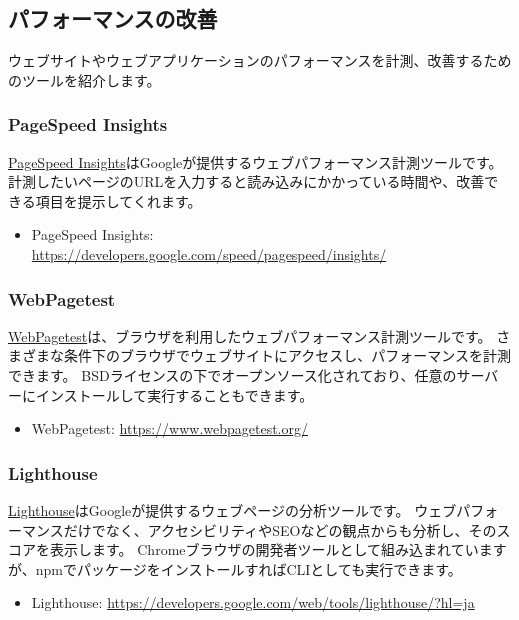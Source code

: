 \hypertarget{performance-improvement}{%
\subsection{パフォーマンスの改善}\label{performance-improvement}}

ウェブサイトやウェブアプリケーションのパフォーマンスを計測、改善するためのツールを紹介します。

\hypertarget{pagespeed}{%
\subsubsection{PageSpeed Insights}\label{pagespeed}}

\href{https://developers.google.com/speed/pagespeed/insights/}{PageSpeed
Insights}はGoogleが提供するウェブパフォーマンス計測ツールです。
計測したいページのURLを入力すると読み込みにかかっている時間や、改善できる項目を提示してくれます。
\begin{itemize}
\item PageSpeed Insights: \url{https://developers.google.com/speed/pagespeed/insights/}
\end{itemize}

\hypertarget{webpagetest}{%
\subsubsection{WebPagetest}\label{webpagetest}}

\href{https://www.webpagetest.org/}{WebPagetest}は、ブラウザを利用したウェブパフォーマンス計測ツールです。
さまざまな条件下のブラウザでウェブサイトにアクセスし、パフォーマンスを計測できます。
BSDライセンスの下でオープンソース化されており、任意のサーバーにインストールして実行することもできます。
\begin{itemize}
\item WebPagetest: \url{https://www.webpagetest.org/}
\end{itemize}

\hypertarget{lighthouse}{%
\subsubsection{Lighthouse}\label{lighthouse}}

\href{https://developers.google.com/web/tools/lighthouse/?hl=ja}{Lighthouse}はGoogleが提供するウェブページの分析ツールです。
ウェブパフォーマンスだけでなく、アクセシビリティやSEOなどの観点からも分析し、そのスコアを表示します。
Chromeブラウザの開発者ツールとして組み込まれていますが、npmでパッケージをインストールすればCLIとしても実行できます。
\begin{itemize}
\item Lighthouse: \url{https://developers.google.com/web/tools/lighthouse/?hl=ja}
\end{itemize}

